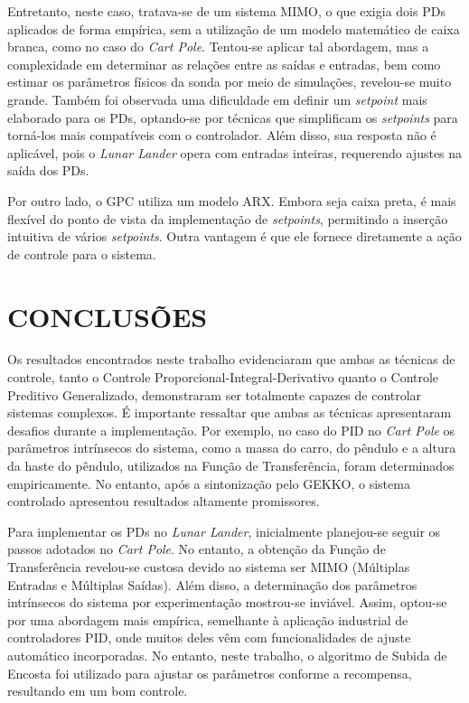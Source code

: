 \documentclass[12pt,           %
a4paper,                       %
openany,                       %
oneside,                       %
chapter=TITLE,                 %
english,                       %
spanish,                       %
brazil,                        %
sumario=tradicional]{abntex2}  %
\begin{document}
\begin{OnehalfSpace}
Entretanto, neste caso, tratava-se de um sistema MIMO, o que exigia dois PDs aplicados de forma empírica, sem a utilização de um modelo matemático de caixa branca, como no caso do \textit{Cart Pole}. Tentou-se aplicar tal abordagem, mas a complexidade em determinar as relações entre as saídas e entradas, bem como estimar os parâmetros físicos da sonda por meio de simulações, revelou-se muito grande. Também foi observada uma dificuldade em definir um \textit{setpoint} mais elaborado para os PDs, optando-se por técnicas que simplificam os \textit{setpoints} para torná-los mais compatíveis com o controlador. Além disso, sua resposta não é aplicável, pois o \textit{Lunar Lander} opera com entradas inteiras, requerendo ajustes na saída dos PDs.

Por outro lado, o GPC utiliza um modelo ARX. Embora seja caixa preta, é mais flexível do ponto de vista da implementação de \textit{setpoints}, permitindo a inserção intuitiva de vários \textit{setpoints}. Outra vantagem é que ele fornece diretamente a ação de controle para o sistema.\\


{\let\clearpage\relax\par \chapter{CONCLUSÕES}}
\label{ch:conclusoes}                       %


Os resultados encontrados neste trabalho evidenciaram que ambas as técnicas de controle, tanto o Controle Proporcional-Integral-Derivativo quanto o Controle Preditivo Generalizado, demonstraram ser totalmente capazes de controlar sistemas complexos. É importante ressaltar que ambas as técnicas apresentaram desafios durante a implementação. Por exemplo, no caso do PID no \textit{Cart Pole} os parâmetros intrínsecos do sistema, como a massa do carro, do pêndulo e a altura da haste do pêndulo, utilizados na Função de Transferência, foram determinados empiricamente. No entanto, após a sintonização pelo GEKKO, o sistema controlado apresentou resultados altamente promissores.

Para implementar os PDs no \textit{Lunar Lander}, inicialmente planejou-se seguir os passos adotados no \textit{Cart Pole}. No entanto, a obtenção da Função de Transferência revelou-se custosa devido ao sistema ser MIMO (Múltiplas Entradas e Múltiplas Saídas). Além disso, a determinação dos parâmetros intrínsecos do sistema por experimentação mostrou-se inviável. Assim, optou-se por uma abordagem mais empírica, semelhante à aplicação industrial de controladores PID, onde muitos deles vêm com funcionalidades de ajuste automático incorporadas. No entanto, neste trabalho, o algoritmo de Subida de Encosta foi utilizado para ajustar os parâmetros conforme a recompensa, resultando em um bom controle.


\end{OnehalfSpace}
\end{document}
